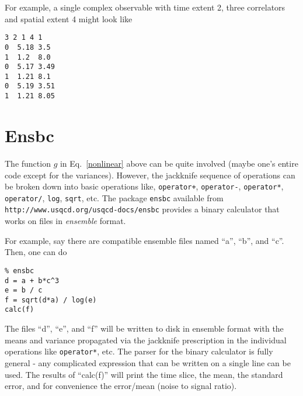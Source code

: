 \documentclass[11pt]{article}
\begin{document}
For example, a single complex observable with time extent 2, three correlators
and spatial extent 4 might look like
\begin{verbatim}
3 2 1 4 1
0  5.18 3.5
1  1.2  8.0
0  5.17 3.49
1  1.21 8.1
0  5.19 3.51
1  1.21 8.05
\end{verbatim}

\section{Ensbc}\label{seq:ensbc}

The function $g$ in Eq.~\ref{nonlinear} above can be quite involved
(maybe one's entire code except for the variances). However, the
jackknife sequence of operations can be broken down into basic
operations like, {\tt operator+}, {\tt operator-}, {\tt operator*},
{\tt operator/}, {\tt log}, {\tt sqrt}, etc. The package {\tt ensbc}
available from {\tt http://www.usqcd.org/usqcd-docs/ensbc} provides
a binary calculator that works on files in {\em ensemble} format. 

For example, say there are compatible ensemble files named ``a'', ``b'',
and ``c''. Then, one can do
\begin{verbatim}
% ensbc
d = a + b*c^3
e = b / c
f = sqrt(d*a) / log(e)
calc(f)
\end{verbatim}
%
The files ``d'', ``e'', and ``f'' will be written to disk in ensemble format
with the means and variance propagated via the jackknife prescription in
the individual operations like {\tt operator*}, etc. The parser for the
binary calculator is fully general - any complicated expression that can
be written on a single line can be used. The results of ``calc(f)'' will print
the time slice, the mean, the standard error, and for convenience the error/mean
(noise to signal ratio).
\end{document}
